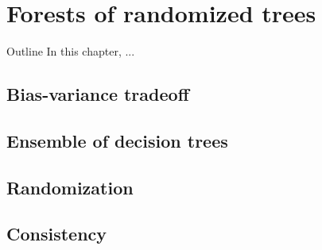 \chapter{Forests of randomized trees}\label{ch:forest}

\begin{remark}{Outline}
In this chapter, ...
\end{remark}

\section{Bias-variance tradeoff}


\section{Ensemble of decision trees}


\section{Randomization}


\section{Consistency}

